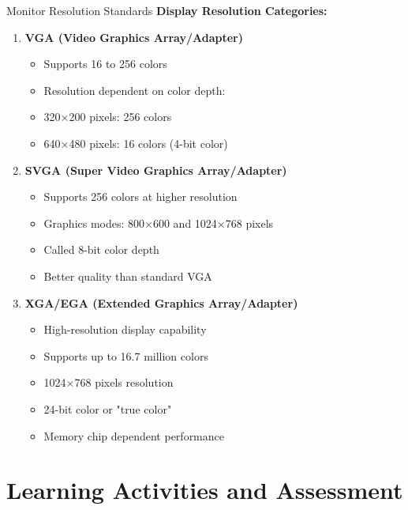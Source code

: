 \documentclass[aspectratio=169]{beamer}
\begin{document}
\begin{frame}{Monitor Resolution Standards}
    \textbf{Display Resolution Categories:}
    
    \begin{enumerate}
        \item \textbf{VGA (Video Graphics Array/Adapter)}
        \begin{itemize}
            \item Supports 16 to 256 colors
            \item Resolution dependent on color depth:
            \item 320×200 pixels: 256 colors
            \item 640×480 pixels: 16 colors (4-bit color)
        \end{itemize}
        
        \item \textbf{SVGA (Super Video Graphics Array/Adapter)}
        \begin{itemize}
            \item Supports 256 colors at higher resolution
            \item Graphics modes: 800×600 and 1024×768 pixels
            \item Called 8-bit color depth
            \item Better quality than standard VGA
        \end{itemize}
        
        \item \textbf{XGA/EGA (Extended Graphics Array/Adapter)}
        \begin{itemize}
            \item High-resolution display capability
            \item Supports up to 16.7 million colors
            \item 1024×768 pixels resolution
            \item 24-bit color or "true color"
            \item Memory chip dependent performance
        \end{itemize}
    \end{enumerate}
\end{frame}

\section{Learning Activities and Assessment}
\end{document}

